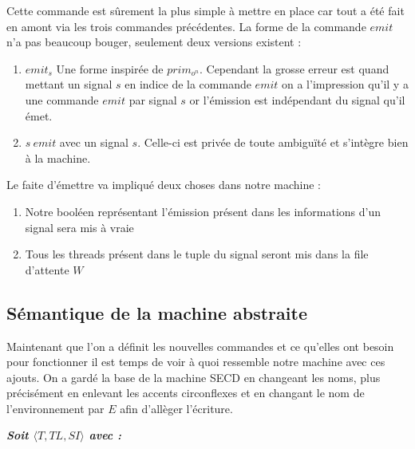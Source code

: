 \documentclass[10pt,a4paper]{report}
\begin{document}
Cette commande est sûrement la plus simple à mettre en place car tout a été fait en amont via les trois commandes précédentes. La forme de la commande $emit$ n'a pas beaucoup bouger, seulement deux versions existent :
\begin{enumerate}
\item $emit_{s}$ Une forme inspirée de $prim_{o^{n}}$. Cependant la grosse erreur est quand mettant un signal $s$ en indice de la commande $emit$ on a l'impression qu'il y a une commande $emit$ par signal $s$ or l'émission est indépendant du signal qu'il émet.
\item $s~emit$ avec un signal $s$. Celle-ci est privée de toute ambiguïté et s'intègre bien à la machine. 
\end{enumerate}
\medbreak

Le faite d'émettre va impliqué deux choses dans notre machine :
\begin{enumerate}					
\item Notre booléen représentant l'émission présent dans les informations d'un signal sera mis à vraie
\item Tous les threads présent dans le tuple du signal seront mis dans la file d'attente $W$ 
\end{enumerate} 
\newpage




\subsection{Sémantique de la machine abstraite}

Maintenant que l'on a définit les nouvelles commandes et ce qu'elles ont besoin pour fonctionner il est temps de voir à quoi ressemble notre machine avec ces ajouts. On a gardé la base de la machine SECD en changeant les noms, plus précisément en enlevant les accents circonflexes et en changant le nom de l'environnement par $E$ afin d'allèger l'écriture.
\bigbreak


\textbf{\textit{Soit $\langle T,TL,SI\rangle$ avec :}}
\end{document}
